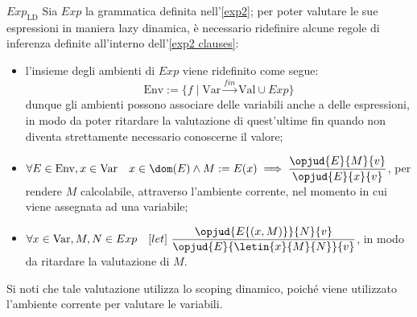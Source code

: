 \documentclass[a4paper, 12pt]{report}
\begin{document}
    \begin{framedprop}{$Exp_\mathrm{LD}$}
        Sia $Exp$ la grammatica definita nell'\cref{exp2}; per poter valutare le sue espressioni in maniera lazy dinamica, è necessario ridefinire alcune regole di inferenza definite all'interno dell'\cref{exp2 clauses}:

        \begin{itemize}
            \item l'insieme degli ambienti di $Exp$ viene ridefinito come segue: $$\mathrm{Env} := \{f \mid \mathrm{Var} \xrightarrow{fin} \mathrm{Val} \cup Exp\}$$ dunque gli ambienti possono associare delle variabili anche a delle espressioni, in modo da poter ritardare la valutazione di quest'ultime fin quando non diventa strettamente necessario conoscerne il valore;
            \item $\forall E \in \mathrm{Env}, x \in \mathrm{Var} \quad x \in \dom(E) \land M := E(x) \implies \dfrac{\opjud{E}{M}{v}}{\opjud{E}{x}{v}}$, per rendere $M$ calcolabile, attraverso l'ambiente corrente, nel momento in cui viene assegnata ad una variabile;
            \item $\forall x \in \mathrm{Var}, M, N \in Exp \quad [let] \ \dfrac{\opjud{E\{(x, M)\}}{N}{v}}{\opjud{E}{\letin{x}{M}{N}}{v}}$, in modo da ritardare la valutazione di $M$.
        \end{itemize}

        Si noti che tale valutazione utilizza lo scoping dinamico, poiché viene utilizzato l'ambiente corrente per valutare le variabili.
    \end{framedprop}
\end{document}

